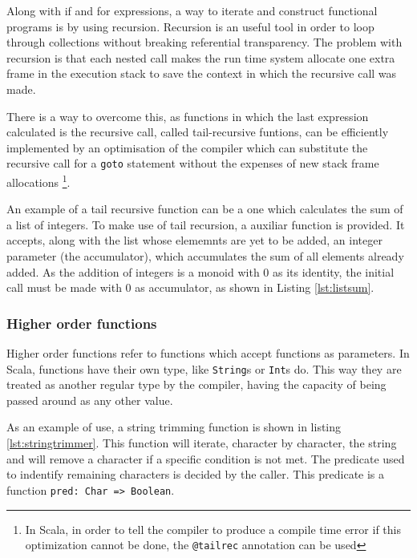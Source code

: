 \documentclass[../main.tex]{subfiles}
\begin{document}
Along with if and for expressions, a way to iterate and construct
functional programs is by using recursion. Recursion is an useful tool in order
to loop through collections without breaking referential transparency. The
problem with recursion is that each nested call makes the run time system allocate one
extra frame in the execution stack to save the context in which the recursive call was
made.

There is a way to overcome this, as functions in which the last expression
calculated is the recursive call, called tail-recursive funtions, can be
efficiently implemented by an optimisation of the compiler which can substitute
the recursive call for a \texttt{goto} statement without the expenses of new
stack frame allocations \autocite{Steele1977DebunkingGoto} \footnote{In Scala,
in order to tell the compiler to produce a compile time error if this
optimization cannot be done, the \texttt{@tailrec} annotation can be
used\autocite{ScalaScala.annotation.tailrec}}.

An example of a tail recursive function can be a one which calculates the sum of
a list of integers. To make use of tail recursion, a auxiliar function is
provided. It accepts, along with the list whose elememnts are yet to be added,
an integer parameter (the accumulator), which accumulates the sum of all
elements already added. As the addition of integers is a monoid with 0 as its
identity, the initial call must be made with 0 as accumulator, as shown in
Listing \ref{lst:listsum}.




\subsubsection{Higher order functions} Higher order functions refer to functions
which accept functions as parameters. In Scala, functions have their own type,
like \texttt{String}s or \texttt{Int}s do. This way they are treated as another
regular type by the compiler, having the capacity of being passed around as any
other value.

As an example of use, a string trimming function is shown in listing
\ref{lst:stringtrimmer}. This function will iterate, character by character, the
string and will remove a character if a specific condition is not met. The
predicate used to indentify remaining characters is decided by the caller. This
predicate is a function \texttt{pred: Char => Boolean}.
\end{document}
